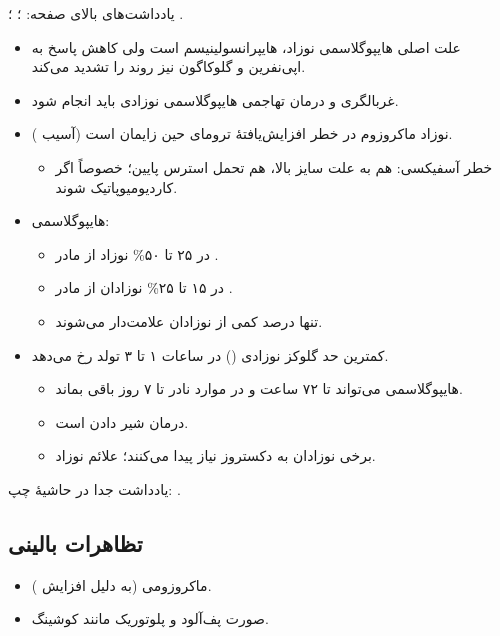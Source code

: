 \documentclass[12pt,a4paper]{article}
\begin{document}
\clearpage
{}
{\footnotesize یادداشت‌های بالای صفحه: ؛ ؛ .\par}
\begin{itemize}
\item علت اصلی هایپوگلاسمی نوزاد، هایپرانسولینیسم است ولی کاهش پاسخ به اپی‌نفرین و گلوکاگون نیز روند را تشدید می‌کند.
\item غربالگری و درمان تهاجمی هایپوگلاسمی نوزادی باید انجام شود.
\item نوزاد ماکروزوم در خطر افزایش‌یافتهٔ ترومای حین زایمان است (آسیب ).
  \begin{itemize}
  \item خطر آسفیکسی: هم به علت سایز بالا، هم تحمل استرس پایین؛ خصوصاً اگر کاردیومیوپاتیک شوند.
  \end{itemize}
\item هایپوگلاسمی:
  \begin{itemize}
  \item در ۲۵ تا ۵۰\% نوزاد از مادر .
  \item در ۱۵ تا ۲۵\% نوزادان از مادر .
  \item تنها درصد کمی از نوزادان علامت‌دار می‌شوند.
  \end{itemize}
\item کمترین حد گلوکز نوزادی () در ساعات ۱ تا ۳ تولد رخ می‌دهد.
  \begin{itemize}
  \item هایپوگلاسمی می‌تواند تا ۷۲ ساعت و در موارد نادر تا ۷ روز باقی بماند.
  \item درمان شیر دادن  است.
  \item برخی نوزادان به دکستروز  نیاز پیدا می‌کنند؛ علائم نوزاد.
  \end{itemize}
\end{itemize}
{\footnotesize یادداشت جدا در حاشیهٔ چپ: .\par}
\subsection*{تظاهرات بالینی}
\begin{itemize}
\item ماکروزومی (به دلیل افزایش ).
\item صورت پف‌آلود و پلوتوریک مانند کوشینگ.
\end{itemize}

\clearpage
{}
\end{document}
